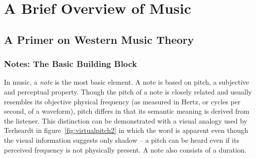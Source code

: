 \chapter{A Brief Overview of Music}

\section{A Primer on Western Music Theory}

\subsection{Notes: The Basic Building Block}

In music, a \textit{note} is the most basic element. A note is based on pitch, a subjective and perceptual property. Though the pitch of a note is closely related and usually resembles its objective physical frequency (as measured in Hertz, or cycles per second, of a waveform), pitch differs in that its semantic meaning is derived from the listener. This distinction can be demonstrated with a visual analogy used by Terheardt\cite{terhardt1974pitch} in figure~\ref{fig:virtualpitch2} in which the word  is apparent even though the visual information suggests only shadow -- a pitch can be heard even if its perceived frequency is not physically present. A note also consists of a duration.